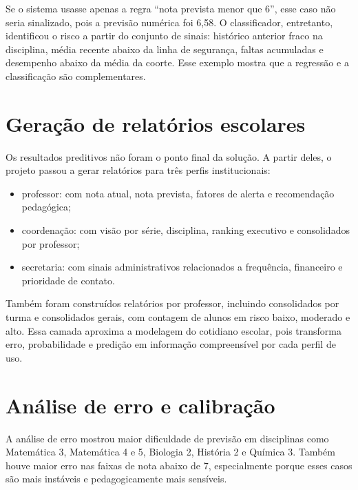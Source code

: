 Se o sistema usasse apenas a regra ``nota prevista menor que 6'', esse caso n\~ao seria sinalizado, pois a previs\~ao num\'erica foi 6,58. O classificador, entretanto, identificou o risco a partir do conjunto de sinais: hist\'orico anterior fraco na disciplina, m\'edia recente abaixo da linha de seguran\c{c}a, faltas acumuladas e desempenho abaixo da m\'edia da coorte. Esse exemplo mostra que a regress\~ao e a classifica\c{c}\~ao s\~ao complementares.

\section{Gera\c{c}\~ao de relat\'orios escolares}
\label{sec:relatorios}

Os resultados preditivos n\~ao foram o ponto final da solu\c{c}\~ao. A partir deles, o projeto passou a gerar relat\'orios para tr\^es perfis institucionais:

\begin{itemize}
    \item professor: com nota atual, nota prevista, fatores de alerta e recomenda\c{c}\~ao pedag\'ogica;
    \item coordena\c{c}\~ao: com vis\~ao por s\'erie, disciplina, ranking executivo e consolidados por professor;
    \item secretaria: com sinais administrativos relacionados a frequ\^encia, financeiro e prioridade de contato.
\end{itemize}

Tamb\'em foram constru\'idos relat\'orios por professor, incluindo consolidados por turma e consolidados gerais, com contagem de alunos em risco baixo, moderado e alto. Essa camada aproxima a modelagem do cotidiano escolar, pois transforma erro, probabilidade e predi\c{c}\~ao em informa\c{c}\~ao compreens\'ivel por cada perfil de uso.

\section{An\'alise de erro e calibra\c{c}\~ao}
\label{sec:erro}

A an\'alise de erro mostrou maior dificuldade de previs\~ao em disciplinas como Matem\'atica 3, Matem\'atica 4 e 5, Biologia 2, Hist\'oria 2 e Qu\'imica 3. Tamb\'em houve maior erro nas faixas de nota abaixo de 7, especialmente porque esses casos s\~ao mais inst\'aveis e pedagogicamente mais sens\'iveis.


